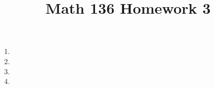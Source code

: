 \documentclass{article}
\title{Math 136 Homework 3}
\begin{document}
\maketitle
\begin{enumerate}
	\item 
	\item 
	\item 
	\item 
\end{enumerate}
\end{document}
